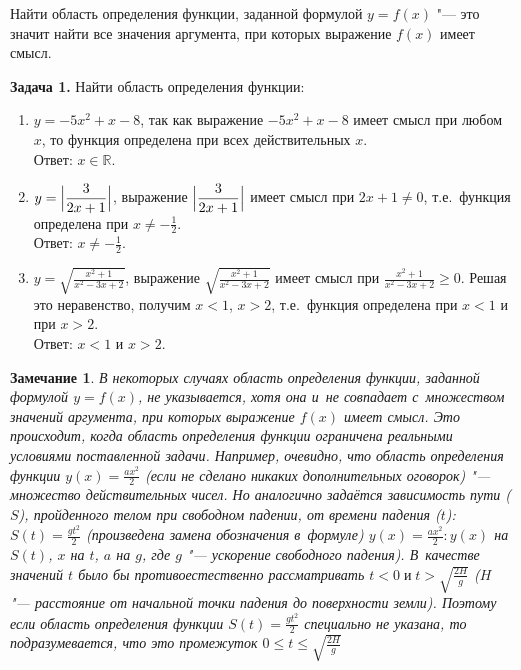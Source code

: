Найти область определения функции, заданной формулой $y=f(x)$ "---
это значит найти все значения аргумента, при которых выражение $f(x)$
имеет смысл.

\textbf{Задача 1.} Найти область определения функции:
\begin{enumerate}
\item $y = -5x^{2}+x-8$, так как выражение $-5x^{2}+x-8$ имеет смысл
при любом $x$, то функция определена при всех действительных $x$.\\
Ответ: $x \in \mathbb{R}$.

\item $\displaystyle y = \Bigl|\frac{3}{2x+1}\Bigr|$,
выражение $\displaystyle\Bigl|\frac{3}{2x+1}\Bigr|$
имеет смысл при $2x+1 \ne 0$,
т.е.\ функция определена при $\displaystyle x \ne -\frac{1}{2}$.\\
Ответ: $\displaystyle x \ne -\frac{1}{2}$.

\item $\displaystyle y = \sqrt{\frac{x^{2}+1}{x^{2}-3x+2}}$,
выражение
$\displaystyle\sqrt{\frac{x^{2}+1}{x^{2}-3x+2}}$
имеет смысл при
$\displaystyle\frac{x^{2}+1}{x^{2}-3x+2} \geqslant 0$.
Решая это неравенство, получим $x<1$, $x>2$,
т.е.\ функция определена при $x<1$ и при $x>2$.\\
Ответ: $x<1$ и $x>2$.
\end{enumerate}

\newtheorem{Note}{Замечание}
\begin{Note}
В некоторых случаях область определения функции, заданной формулой
$y = f(x)$, не указывается, хотя она и~не совпадает с~множеством значений
аргумента, при которых выражение $f(x)$ имеет смысл. Это происходит, когда
область определения функции ограничена реальными условиями поставленной
задачи. Например, очевидно, что область определения функции
$\displaystyle y(x) = \frac{ax^{2}}{2}$
(если не сделано никаких дополнительных оговорок)
"--- множество действительных чисел. Но аналогично задаётся зависимость
пути ($S$), пройденного телом при свободном падении, от времени падения
($t$):
$\displaystyle S(t) = \frac{gt^{2}}{2}$
(произведена замена обозначения в~формуле)
$\displaystyle y(x) = \frac{ax^{2}}{2}: y(x)$
на $S(t)$, $x$ на $t$, $a$ на $g$,
где $g$ "--- ускорение свободного падения).
В~качестве значений $t$ было бы противоестественно рассматривать
$t<0 \; \text{и} \; \displaystyle t>\sqrt{\frac{2H}{g}}$
($H$ "--- расстояние от начальной точки падения до поверхности земли).
Поэтому если область определения функции
$\displaystyle S(t) = \frac{gt^{2}}{2}$
специально не указана, то подразумевается, что это промежуток
$\displaystyle 0 \leqslant t \leqslant \sqrt{\frac{2H}{g}}$
\end{Note}

